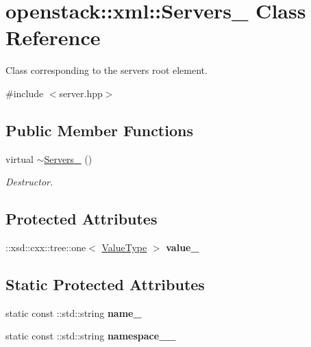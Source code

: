 \hypertarget{classopenstack_1_1xml_1_1Servers__}{
\section{openstack::xml::Servers\_\- Class Reference}
\label{classopenstack_1_1xml_1_1Servers__}
}


Class corresponding to the servers root element.  




{\ttfamily \#include $<$server.hpp$>$}

\subsection*{Public Member Functions}
\begin{DoxyCompactItemize}
\item 
\hypertarget{classopenstack_1_1xml_1_1Servers___a49679e2add0f6a99f910db7cdfef54ba}{
virtual \hyperlink{classopenstack_1_1xml_1_1Servers___a49679e2add0f6a99f910db7cdfef54ba}{$\sim$Servers\_\-} ()}
\label{classopenstack_1_1xml_1_1Servers___a49679e2add0f6a99f910db7cdfef54ba}

\begin{DoxyCompactList}\small\item\em Destructor. \item\end{DoxyCompactList}\end{DoxyCompactItemize}
\subsection*{Protected Attributes}
\begin{DoxyCompactItemize}
\item 
\hypertarget{classopenstack_1_1xml_1_1Servers___a3f3e3f55ed3f99988fbf2199fe453ec6}{
::xsd::cxx::tree::one$<$ \hyperlink{classopenstack_1_1xml_1_1Servers}{ValueType} $>$ {\bfseries value\_\-}}
\label{classopenstack_1_1xml_1_1Servers___a3f3e3f55ed3f99988fbf2199fe453ec6}

\end{DoxyCompactItemize}
\subsection*{Static Protected Attributes}
\begin{DoxyCompactItemize}
\item 
\hypertarget{classopenstack_1_1xml_1_1Servers___a2ba7c84aa27d4c360027e40edbaaa17a}{
static const ::std::string {\bfseries name\_\-}}
\label{classopenstack_1_1xml_1_1Servers___a2ba7c84aa27d4c360027e40edbaaa17a}

\item 
\hypertarget{classopenstack_1_1xml_1_1Servers___a217aaa754ab79e22f8c7e4c115ae4a7e}{
static const ::std::string {\bfseries namespace\_\-\_\-}}
\label{classopenstack_1_1xml_1_1Servers___a217aaa754ab79e22f8c7e4c115ae4a7e}

\end{DoxyCompactItemize}
